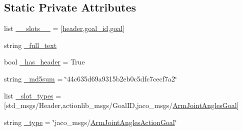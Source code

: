 \subsection*{Static Private Attributes}
\begin{DoxyCompactItemize}
\item 
list \hyperlink{classjaco__msgs_1_1msg_1_1__ArmJointAnglesActionGoal_1_1ArmJointAnglesActionGoal_ae515da28ad91eefd0ad6fa17d3b05450}{\+\_\+\+\_\+slots\+\_\+\+\_\+} = \mbox{[}\textquotesingle{}\hyperlink{classjaco__msgs_1_1msg_1_1__ArmJointAnglesActionGoal_1_1ArmJointAnglesActionGoal_aaea49c5d26e095d3e05e1164e8b78f88}{header}\textquotesingle{},\textquotesingle{}\hyperlink{classjaco__msgs_1_1msg_1_1__ArmJointAnglesActionGoal_1_1ArmJointAnglesActionGoal_a7c8303d67ea7eab4c1eb71988d980183}{goal\+\_\+id}\textquotesingle{},\textquotesingle{}\hyperlink{classjaco__msgs_1_1msg_1_1__ArmJointAnglesActionGoal_1_1ArmJointAnglesActionGoal_ad21a72cdb415ceec3c8f770f97a2f445}{goal}\textquotesingle{}\mbox{]}
\item 
string \hyperlink{classjaco__msgs_1_1msg_1_1__ArmJointAnglesActionGoal_1_1ArmJointAnglesActionGoal_ab725571e11c038de7a16ca3a3d0703ab}{\+\_\+full\+\_\+text}
\item 
bool \hyperlink{classjaco__msgs_1_1msg_1_1__ArmJointAnglesActionGoal_1_1ArmJointAnglesActionGoal_ab0caac53464467f1280949f7d57d1cce}{\+\_\+has\+\_\+header} = True
\item 
string \hyperlink{classjaco__msgs_1_1msg_1_1__ArmJointAnglesActionGoal_1_1ArmJointAnglesActionGoal_a8eaee2cbc1ce17ec2ca14eb6b9a78d7f}{\+\_\+md5sum} = \char`\"{}44c635d69a9315b2eb0c5dfc7cecf7a2\char`\"{}
\item 
list \hyperlink{classjaco__msgs_1_1msg_1_1__ArmJointAnglesActionGoal_1_1ArmJointAnglesActionGoal_ae11d55592f67ddde3b325cdea370eed7}{\+\_\+slot\+\_\+types} = \mbox{[}\textquotesingle{}std\+\_\+msgs/Header\textquotesingle{},\textquotesingle{}actionlib\+\_\+msgs/Goal\+ID\textquotesingle{},\textquotesingle{}jaco\+\_\+msgs/\hyperlink{classjaco__msgs_1_1msg_1_1__ArmJointAnglesGoal_1_1ArmJointAnglesGoal}{Arm\+Joint\+Angles\+Goal}\textquotesingle{}\mbox{]}
\item 
string \hyperlink{classjaco__msgs_1_1msg_1_1__ArmJointAnglesActionGoal_1_1ArmJointAnglesActionGoal_afd5c71072a43074e4dfaa18095ec9780}{\+\_\+type} = \char`\"{}jaco\+\_\+msgs/\hyperlink{classjaco__msgs_1_1msg_1_1__ArmJointAnglesActionGoal_1_1ArmJointAnglesActionGoal}{Arm\+Joint\+Angles\+Action\+Goal}\char`\"{}
\end{DoxyCompactItemize}


